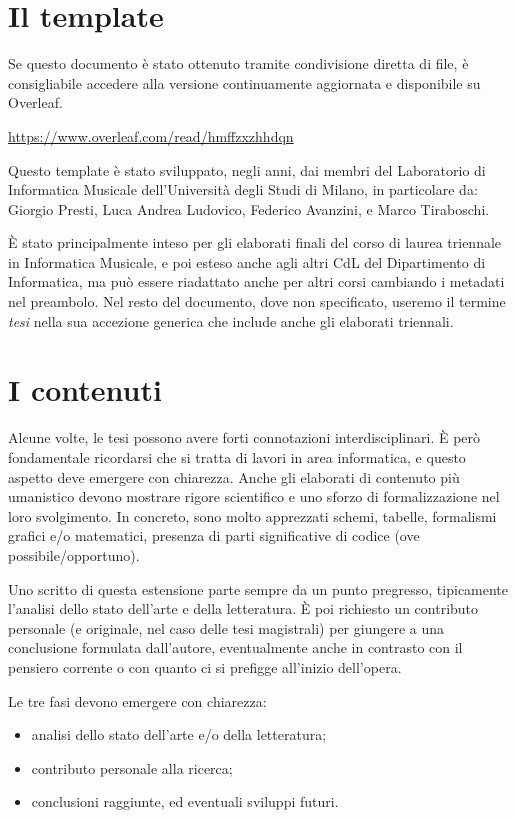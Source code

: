 \documentclass[12pt]{report}
\begin{document}
\section{Il template}
Se questo documento è stato ottenuto tramite condivisione diretta di file, è consigliabile accedere alla versione continuamente aggiornata e disponibile su Overleaf. \begin{center}
    \url{https://www.overleaf.com/read/hmffzxzhhdqn}
\end{center}

Questo template è stato sviluppato, negli anni, dai membri del Laboratorio di Informatica Musicale dell'Università degli Studi di Milano, in particolare da: Giorgio Presti, Luca Andrea Ludovico, Federico Avanzini, e Marco Tiraboschi.

È stato principalmente inteso per gli elaborati finali del corso di laurea triennale in Informatica Musicale, e poi esteso anche agli altri CdL del Dipartimento di Informatica, ma può essere riadattato anche per altri corsi cambiando i metadati nel preambolo. Nel resto del documento, dove non specificato, useremo il termine \textit{tesi} nella sua accezione generica che include anche gli elaborati triennali.

\section{I contenuti}
\label{sec:contenuti}

Alcune volte, le tesi possono avere forti connotazioni interdisciplinari. \`{E} però fondamentale ricordarsi che si tratta di lavori in area informatica, e questo aspetto deve emergere con chiarezza. Anche gli elaborati di contenuto più umanistico devono mostrare rigore scientifico e uno sforzo di formalizzazione nel loro svolgimento. In concreto, sono molto apprezzati schemi, tabelle, formalismi grafici e/o matematici, presenza di parti significative di codice (ove possibile/opportuno).

Uno scritto di questa estensione parte sempre da un punto pregresso, tipicamente l'analisi dello stato dell'arte e della letteratura. \`{E} poi richiesto un contributo personale (e originale, nel caso delle tesi magistrali) per giungere a una conclusione formulata dall'autore, eventualmente anche in contrasto con il pensiero corrente o con quanto ci si prefigge all'inizio dell'opera.

Le tre fasi devono emergere con chiarezza:
\begin{itemize}
	\item analisi dello stato dell'arte e/o della letteratura;
	\item contributo personale alla ricerca;
	\item conclusioni raggiunte, ed eventuali sviluppi futuri.
\end{itemize}
\end{document}
